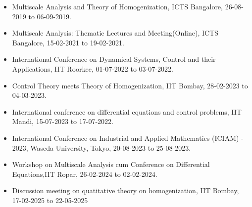 \documentclass[a4paper,11pt]{letter}
\begin{document}
	\begin{itemize}
		\item Multiscale Analysis and Theory of Homogenization, ICTS Bangalore, 26-08-2019 to 06-09-2019.
		\item Multiscale Analysis: Thematic Lectures and Meeting(Online), ICTS Bangalore, 15-02-2021 to 19-02-2021.  
		\item International Conference on Dynamical Systems, Control and their Applications, IIT Roorkee, 01-07-2022 to 03-07-2022.
		\item Control Theory meets Theory of Homogenization, IIT Bombay, 28-02-2023 to 04-03-2023.
		\item International conference on differential equations and control problems, IIT Mandi, 15-07-2023 to 17-07-2022.
		\item International Conference on Industrial and Applied Mathematics (ICIAM) - 2023, Waseda University, Tokyo, 20-08-2023 to 25-08-2023.
		\item Workshop on Multiscale Analysis cum Conference on Differential Equations,IIT Ropar, 26-02-2024 to 02-02-2024.
		\item Discussion meeting on quatitative theory on homogenization, IIT Bombay, 17-02-2025 to 22-05-2025
	\end{itemize}
	
	
\end{document}
